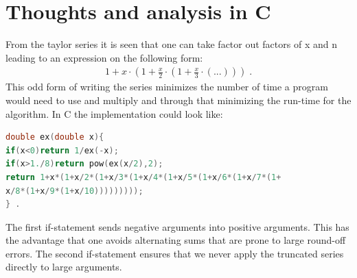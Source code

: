 \documentclass{article}
\begin{document}
\section{Thoughts and analysis in C}
From the taylor series it is seen that one can take factor out factors of x and 
n leading to an expression on the following form:
\begin{align}
1+x\cdot(1+\frac{x}{2}\cdot(1+\frac{x}{3}\cdot(...))) \; .
\end{align}
This odd form of writing the series minimizes the number of time a program would need to use and multiply and through that minimizing the run-time for the algorithm. 
In C the implementation could look like:
\begin{lstlisting}[language=C]
double ex(double x){
if(x<0)return 1/ex(-x);
if(x>1./8)return pow(ex(x/2),2);
return 1+x*(1+x/2*(1+x/3*(1+x/4*(1+x/5*(1+x/6*(1+x/7*(1+
x/8*(1+x/9*(1+x/10)))))))));
} . 
\end{lstlisting}
The first if-statement sends negative arguments into positive arguments. This has the advantage that one avoids alternating sums that are prone to
large round-off errors. The second if-statement ensures that we never apply the truncated series directly to large arguments.
\end{document}
